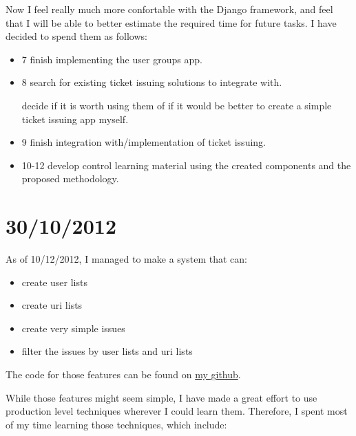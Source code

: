 \documentclass[12pt]{article}
\begin{document}
Now I feel really much more confortable with the Django framework, and feel that I will be able to better
estimate the required time for future tasks. I have decided to spend them as follows:

\begin{itemize}
  \item 7 finish implementing the user groups app.
  \item 8 search for existing ticket issuing solutions to integrate with.
  
    decide if it is worth using them of if it would be better to create a simple ticket issuing app myself.
    
  \item 9 finish integration with/implementation of ticket issuing.
  \item 10-12 develop control learning material using the created components and the proposed methodology.
\end{itemize}

\section{30/10/2012} \label{what-i-did}

As of 10/12/2012, I managed to make a system that can:

\begin{itemize}
  \item create user lists
  \item create uri lists
  \item create very simple issues
  \item filter the issues by user lists and uri lists
\end{itemize}

The code for those features can be found on \href{https://github.com/cirosantilli/python/tree/a25d7e5de30c7013e2802e4a5a3630e3b8372c07/cirosantilli/django}{my github}.

While those features might seem simple, I have made a great effort to use production level techniques
wherever I could learn them. Therefore, I spent most of my time learning those techniques, which include:
\end{document}
